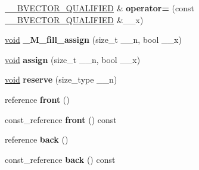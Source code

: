 \begin{DoxyCompactItemize}
\item 
\mbox{\label{class_____b_v_e_c_t_o_r___q_u_a_l_i_f_i_e_d_aa3f9f30c4e2adf4bc3e32d62bb3f7826}} 
\hyperlink{class_____b_v_e_c_t_o_r___q_u_a_l_i_f_i_e_d}{\+\_\+\+\_\+\+B\+V\+E\+C\+T\+O\+R\+\_\+\+Q\+U\+A\+L\+I\+F\+I\+ED} \& {\bfseries operator=} (const \hyperlink{class_____b_v_e_c_t_o_r___q_u_a_l_i_f_i_e_d}{\+\_\+\+\_\+\+B\+V\+E\+C\+T\+O\+R\+\_\+\+Q\+U\+A\+L\+I\+F\+I\+ED} \&\+\_\+\+\_\+x)
\item 
\mbox{\label{class_____b_v_e_c_t_o_r___q_u_a_l_i_f_i_e_d_a2a75beb8727153000fedc430a3894183}} 
\hyperlink{interfacevoid}{void} {\bfseries \+\_\+\+M\+\_\+fill\+\_\+assign} (size\+\_\+t \+\_\+\+\_\+n, bool \+\_\+\+\_\+x)
\item 
\mbox{\label{class_____b_v_e_c_t_o_r___q_u_a_l_i_f_i_e_d_a4d87f4fd63c27c41d9b1d38f3da95cc0}} 
\hyperlink{interfacevoid}{void} {\bfseries assign} (size\+\_\+t \+\_\+\+\_\+n, bool \+\_\+\+\_\+x)
\item 
\mbox{\label{class_____b_v_e_c_t_o_r___q_u_a_l_i_f_i_e_d_aa1d9b1683fa7af48e6d3960da45402b3}} 
\hyperlink{interfacevoid}{void} {\bfseries reserve} (size\+\_\+type \+\_\+\+\_\+n)
\item 
\mbox{\label{class_____b_v_e_c_t_o_r___q_u_a_l_i_f_i_e_d_a2282acb314b0468cae44a39e64b84aad}} 
reference {\bfseries front} ()
\item 
\mbox{\label{class_____b_v_e_c_t_o_r___q_u_a_l_i_f_i_e_d_a02ced561777181f6da94739490f3aec6}} 
const\+\_\+reference {\bfseries front} () const
\item 
\mbox{\label{class_____b_v_e_c_t_o_r___q_u_a_l_i_f_i_e_d_a35f011ac30c708e7f864b2884e90bcb4}} 
reference {\bfseries back} ()
\item 
\mbox{\label{class_____b_v_e_c_t_o_r___q_u_a_l_i_f_i_e_d_abefae89daeffdffd4db2367422f159da}} 
const\+\_\+reference {\bfseries back} () const

\end{DoxyCompactItemize}
